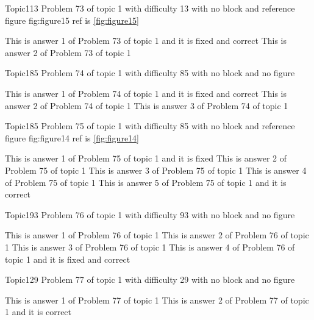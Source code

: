 \documentclass[master]{exam}
\begin{document}
\begin{problem}{Topic1}{13}
	Problem 73 of topic 1 with difficulty 13 with no block and reference figure fig:figure15 ref is \ref{fig:figure15}
	\begin{answers}
		 This is answer 1 of Problem 73 of topic 1 and it is fixed and correct
		\answer This is answer 2 of Problem 73 of topic 1 
	\end{answers}
\end{problem}

\begin{problem}{Topic1}{85}
	Problem 74 of topic 1 with difficulty 85 with no block and no figure
	\begin{answers}
		 This is answer 1 of Problem 74 of topic 1 and it is fixed and correct
		\answer This is answer 2 of Problem 74 of topic 1 
		\answer This is answer 3 of Problem 74 of topic 1 
	\end{answers}
\end{problem}

\begin{problem}{Topic1}{85}
	Problem 75 of topic 1 with difficulty 85 with no block and reference figure fig:figure14 ref is \ref{fig:figure14}
	\begin{answers}
		\answer[fixed] This is answer 1 of Problem 75 of topic 1 and it is fixed
		\answer This is answer 2 of Problem 75 of topic 1 
		\answer This is answer 3 of Problem 75 of topic 1 
		\answer This is answer 4 of Problem 75 of topic 1 
		\answer[correct] This is answer 5 of Problem 75 of topic 1 and it is correct
	\end{answers}
\end{problem}

\begin{problem}{Topic1}{93}
	Problem 76 of topic 1 with difficulty 93 with no block and no figure
	\begin{answers}
		\answer This is answer 1 of Problem 76 of topic 1 
		\answer This is answer 2 of Problem 76 of topic 1 
		\answer This is answer 3 of Problem 76 of topic 1 
		 This is answer 4 of Problem 76 of topic 1 and it is fixed and correct
	\end{answers}
\end{problem}

\begin{problem}{Topic1}{29}
	Problem 77 of topic 1 with difficulty 29 with no block and no figure
	\begin{answers}
		\answer This is answer 1 of Problem 77 of topic 1 
		\answer[correct] This is answer 2 of Problem 77 of topic 1 and it is correct
	\end{answers}
\end{problem}
\end{document}
